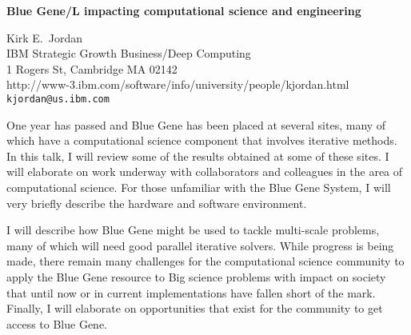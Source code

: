 \documentclass{report}
\begin{document}

\begin{center}
{\large
{\bf Blue Gene/L impacting computational science and engineering}}

	Kirk E.~Jordan \\
	IBM Strategic Growth Business/Deep Computing \\
	1 Rogers St, Cambridge MA 02142 \\
	http://www-3.ibm.com/software/info/university/people/kjordan.html \\
	{\tt kjordan@us.ibm.com}
\end{center}
One year has passed and Blue Gene has been placed at several
sites, many of which have a computational science component
that involves iterative methods. In this talk, I will review
some of the results obtained at some of these sites. I will
elaborate on work underway with collaborators and colleagues
in the area of computational science. For those unfamiliar
with the Blue Gene System, I will very briefly describe the
hardware and software environment.

I will describe how
Blue Gene might be used to tackle multi-scale problems, many
of which will need good parallel iterative solvers. While
progress is being made, there remain many challenges for the
computational science community to apply the Blue Gene
resource to Big science problems with impact on society that
until now or in current implementations have fallen short of
the mark. Finally, I will elaborate on opportunities that
exist for the community to get access to Blue Gene.



\end{document}
